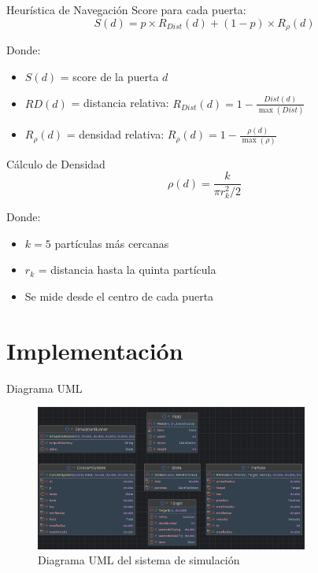 \documentclass[aspectratio=169]{beamer}
\begin{document}
\begin{frame}{Heurística de Navegación}
    Score para cada puerta:
    \begin{equation}
        S(d) = p \times R_{Dist}(d) + (1-p) \times R_\rho(d)
    \end{equation}
    
    Donde:
    \begin{itemize}
        \item $S(d)$ = score de la puerta $d$
        \item $RD(d)$ = distancia relativa: $R_{Dist}(d) = 1 - \frac{Dist(d)}{\max(Dist)}$
        \item $R_\rho(d)$ = densidad relativa: $R_\rho(d) = 1 - \frac{\rho(d)}{\max(\rho)}$
    \end{itemize}
\end{frame}

\begin{frame}{Cálculo de Densidad}
    \begin{equation}
        \rho(d) = \frac{k}{\pi r_k^2/2}
    \end{equation}
    
    Donde:
    \begin{itemize}
        \item $k=5$ partículas más cercanas
        \item $r_k$ = distancia hasta la quinta partícula
        \item Se mide desde el centro de cada puerta
    \end{itemize}
\end{frame}
\section{Implementación}

\begin{frame}{Diagrama UML}
    \begin{figure}
        \centering
        \includegraphics[width=0.8\textwidth]{img/UML.jpg}
        \caption{Diagrama UML del sistema de simulación}
    \end{figure}
\end{frame}
\end{document}

